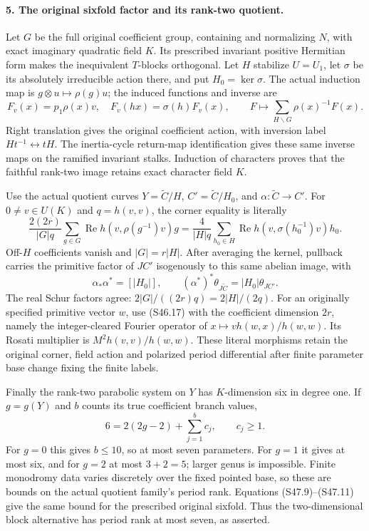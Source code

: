 \paragraph{5. The original sixfold factor and its rank-two quotient.}
Let \(G\) be the full original coefficient group, containing
and normalizing \(N\), with exact imaginary quadratic field
\(K\). Its prescribed invariant positive Hermitian form
makes the inequivalent \(T\)-blocks orthogonal. Let \(H\)
stabilize \(U=U_1\), let \(\sigma\) be its absolutely
irreducible action there, and put \(H_0=\ker\sigma\).
The actual induction map is \(g\otimes u\mapsto\rho(g)u\);
the induced functions and inverse are
\[
 F_v(x)=p_1\rho(x)v,\quad F_v(hx)=\sigma(h)F_v(x),
 \qquad F\longmapsto\sum_{H\backslash G}\rho(x)^{-1}F(x).
 \tag{S47.9}
\]
Right translation gives the original coefficient action,
with inversion label \(Ht^{-1}\leftrightarrow tH\).
The inertia-cycle return-map identification gives these
same inverse maps on the ramified invariant stalks.
Induction of characters proves that the faithful rank-two
image retains exact character field \(K\).

Use the actual quotient curves
\(Y=\widetilde C/H\), \(C'=\widetilde C/H_0\), and
\(\alpha:\widetilde C\to C'\). For \(0\ne v\in U(K)\)
and \(q=h(v,v)\), the corner equality is literally
\[
 \frac{2(2r)}{|G|q}\sum_{g\in G}
  \operatorname{Re}h(v,\rho(g^{-1})v)g
 =\frac4{|H|q}\sum_{h_0\in H}
  \operatorname{Re}h(v,\sigma(h_0^{-1})v)h_0.
 \tag{S47.10}
\]
Off-\(H\) coefficients vanish and \(|G|=r|H|\).
After averaging the kernel, pullback carries the primitive
factor of \(JC'\) isogenously to this same abelian image,
with
\[
 \alpha_*\alpha^*=[|H_0|],\qquad
    (\alpha^*)^*\theta_{J\widetilde C}=|H_0|\theta_{JC'}.
 \tag{S47.11}
\]
The real Schur factors agree:
\(2|G|/((2r)q)=2|H|/(2q)\). For an originally specified
primitive vector \(w\), use (S46.17) with the coefficient
dimension \(2r\), namely the integer-cleared Fourier
operator of \(x\mapsto v h(w,x)/h(w,w)\).
Its Rosati multiplier is \(M^2h(v,v)/h(w,w)\).
These literal morphisms retain the original corner,
field action and polarized period differential after
finite parameter base change fixing the finite labels.

Finally the rank-two parabolic system on \(Y\) has
\(K\)-dimension six in degree one. If \(g=g(Y)\)
and \(b\) counts its true coefficient branch values,
\[
                    6=2(2g-2)+\sum_{j=1}^b c_j,
                          \qquad c_j\ge1.
 \tag{S47.12}
\]
For \(g=0\) this gives \(b\le10\), so at most seven
parameters. For \(g=1\) it gives at most six, and for
\(g=2\) at most \(3+2=5\); larger genus is impossible.
Finite monodromy data varies discretely over the fixed
pointed base, so these are bounds on the actual quotient
family's period rank. Equations (S47.9)--(S47.11) give
the same bound for the prescribed original sixfold.
Thus the two-dimensional block alternative has period
rank at most seven, as asserted.
